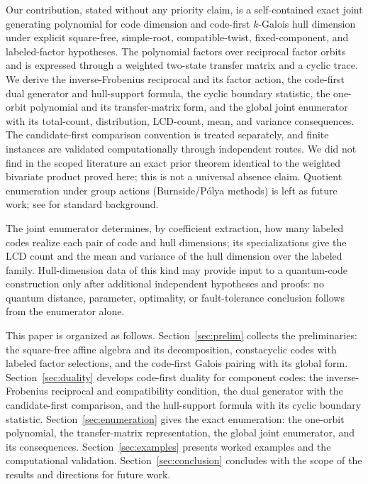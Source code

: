 \documentclass[11pt]{article}
\theoremstyle{plain}
\theoremstyle{definition}
\theoremstyle{remark}
\begin{document}
Our contribution, stated without any priority claim, is a self-contained exact joint generating polynomial for code dimension and code-first $k$-Galois hull dimension under explicit square-free, simple-root, compatible-twist, fixed-component, and labeled-factor hypotheses. The polynomial factors over reciprocal factor orbits and is expressed through a weighted two-state transfer matrix and a cyclic trace. We derive the inverse-Frobenius reciprocal and its factor action, the code-first dual generator and hull-support formula, the cyclic boundary statistic, the one-orbit polynomial and its transfer-matrix form, and the global joint enumerator with its total-count, distribution, LCD-count, mean, and variance consequences. The candidate-first comparison convention is treated separately, and finite instances are validated computationally through independent routes. We did not find in the scoped literature an exact prior theorem identical to the weighted bivariate product proved here; this is not a universal absence claim. Quotient enumeration under group actions (Burnside/P\'olya methods) is left as future work; see \cite{vanLintWilson2001} for standard background.

The joint enumerator determines, by coefficient extraction, how many labeled codes realize each pair of code and hull dimensions; its specializations give the LCD count and the mean and variance of the hull dimension over the labeled family. Hull-dimension data of this kind may provide input to a quantum-code construction only after additional independent hypotheses and proofs: no quantum distance, parameter, optimality, or fault-tolerance conclusion follows from the enumerator alone.

This paper is organized as follows. Section~\ref{sec:prelim} collects the preliminaries: the square-free affine algebra and its decomposition, constacyclic codes with labeled factor selections, and the code-first Galois pairing with its global form. Section~\ref{sec:duality} develops code-first duality for component codes: the inverse-Frobenius reciprocal and compatibility condition, the dual generator with the candidate-first comparison, and the hull-support formula with its cyclic boundary statistic. Section~\ref{sec:enumeration} gives the exact enumeration: the one-orbit polynomial, the transfer-matrix representation, the global joint enumerator, and its consequences. Section~\ref{sec:examples} presents worked examples and the computational validation. Section~\ref{sec:conclusion} concludes with the scope of the results and directions for future work.
\end{document}
